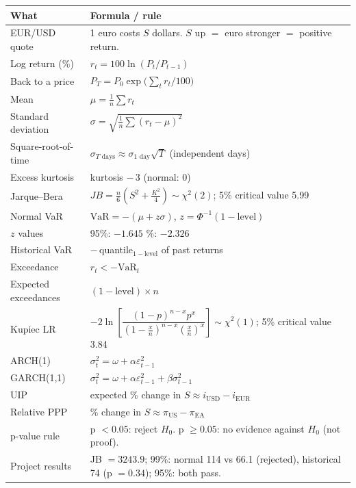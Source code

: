 \documentclass[11pt,a4paper]{article}
\begin{document}
\begin{center}
\renewcommand{\arraystretch}{1.6}
\begin{tabular}{p{}p{}}
\toprule
\textbf{What} & \textbf{Formula / rule} \\
\midrule
EUR/USD quote & 1 euro costs $S$ dollars. $S$ up $=$ euro stronger $=$
  positive return. \\
Log return (\%) & $r_t = 100\ln(P_t/P_{t-1})$ \\
Back to a price & $P_T = P_0 \exp\!\big(\sum_t r_t/100\big)$ \\
Mean & $\mu = \frac{1}{n}\sum r_t$ \\
Standard deviation & $\sigma = \sqrt{\frac{1}{n}\sum (r_t-\mu)^2}$ \\
Square-root-of-time & $\sigma_{T\text{ days}} \approx \sigma_{\text{1 day}}\sqrt{T}$
  (independent days) \\
Excess kurtosis & kurtosis $-\,3$ (normal: 0) \\
Jarque--Bera & $JB = \frac{n}{6}\left(S^2 + \frac{K^2}{4}\right) \sim
  \chi^2(2)$; 5\% critical value 5.99 \\
Normal VaR & $\text{VaR} = -(\mu + z\sigma)$, $z = \Phi^{-1}(1-\text{level})$ \\
$z$ values & 95\%: $-1.645$ \quad 99\%: $-2.326$ \\
Historical VaR & $-\,$quantile$_{1-\text{level}}$ of past returns \\
Exceedance & $r_t < -\text{VaR}_t$ \\
Expected exceedances & $(1-\text{level}) \times n$ \\
Kupiec LR & $-2\ln\!\left[\dfrac{(1-p)^{n-x}p^{x}}
  {(1-\frac{x}{n})^{n-x}(\frac{x}{n})^{x}}\right] \sim \chi^2(1)$;
  5\% critical value 3.84 \\
ARCH(1) & $\sigma_t^2 = \omega + \alpha\varepsilon_{t-1}^2$ \\
GARCH(1,1) & $\sigma_t^2 = \omega + \alpha\varepsilon_{t-1}^2 +
  \beta\sigma_{t-1}^2$ \\
UIP & expected \% change in $S \approx i_{\text{USD}} - i_{\text{EUR}}$ \\
Relative PPP & \% change in $S \approx \pi_{\text{US}} - \pi_{\text{EA}}$ \\
\midrule
p-value rule & p $< 0.05$: reject $H_0$. p $\ge 0.05$: no evidence against
  $H_0$ (not proof). \\
Project results & JB $= 3243.9$; 99\%: normal 114 vs 66.1 (rejected),
  historical 74 (p $=0.34$); 95\%: both pass. \\
\bottomrule
\end{tabular}
\end{center}

\newpage


\end{document}

